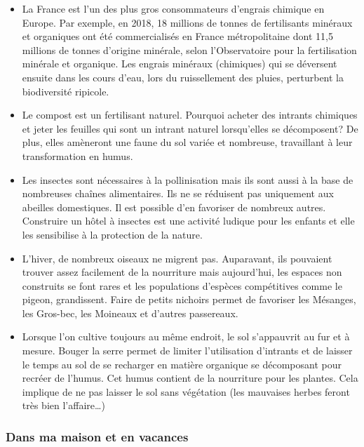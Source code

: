 \begin{itemize}
\item
  La France est l'un des plus gros consommateurs d'engrais chimique en
  Europe. Par exemple, en 2018, 18 millions de tonnes de fertilisants
  minéraux et organiques ont été commercialisés en France métropolitaine
  dont 11,5 millions de tonnes d'origine minérale, selon l'Observatoire
  pour la fertilisation minérale et organique. Les engrais minéraux
  (chimiques) qui se déversent ensuite dans les cours d'eau, lors du
  ruissellement des pluies, perturbent la biodiversité ripicole.\\
\item
  Le compost est un fertilisant naturel. Pourquoi acheter des intrants
  chimiques et jeter les feuilles qui sont un intrant naturel
  lorsqu'elles se décomposent? De plus, elles amèneront une faune du sol
  variée et nombreuse, travaillant à leur transformation en humus.\\
\item
  Les insectes sont nécessaires à la pollinisation mais ils sont aussi à
  la base de nombreuses chaînes alimentaires. Ils ne se réduisent pas
  uniquement aux abeilles domestiques. Il est possible d'en favoriser de
  nombreux autres. Construire un hôtel à insectes est une activité
  ludique pour les enfants et elle les sensibilise à la protection de la
  nature.\\
\item
  L'hiver, de nombreux oiseaux ne migrent pas. Auparavant, ils pouvaient
  trouver assez facilement de la nourriture mais aujourd'hui, les
  espaces non construits se font rares et les populations d'espèces
  compétitives comme le pigeon, grandissent. Faire de petits nichoirs
  permet de favoriser les Mésanges, les Gros-bec, les Moineaux et
  d'autres passereaux.\\
\item
  Lorsque l'on cultive toujours au même endroit, le sol s'appauvrit au
  fur et à mesure. Bouger la serre permet de limiter l'utilisation
  d'intrants et de laisser le temps au sol de se recharger en matière
  organique se décomposant pour recréer de l'humus. Cet humus contient
  de la nourriture pour les plantes. Cela implique de ne pas laisser le
  sol sans végétation (les mauvaises herbes feront très bien
  l'affaire\ldots)
\end{itemize}

\hypertarget{dans-ma-maison-et-en-vacances}{%
\subsubsection{Dans ma maison et en
vacances}\label{dans-ma-maison-et-en-vacances}}


